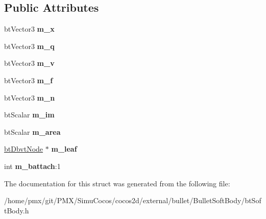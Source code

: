 \subsection*{Public Attributes}
\begin{DoxyCompactItemize}
\item 
\mbox{\label{structbtSoftBody_1_1Node_a302f526590ac3cd265eccfd3f1cfd817}} 
bt\+Vector3 {\bfseries m\+\_\+x}
\item 
\mbox{\label{structbtSoftBody_1_1Node_ab41394c67b5514c0114c6cb0da2d7bb8}} 
bt\+Vector3 {\bfseries m\+\_\+q}
\item 
\mbox{\label{structbtSoftBody_1_1Node_ab286626ebbca7d0ab07fb5bf04232540}} 
bt\+Vector3 {\bfseries m\+\_\+v}
\item 
\mbox{\label{structbtSoftBody_1_1Node_aebe1f784e80e576a11338c21a5717069}} 
bt\+Vector3 {\bfseries m\+\_\+f}
\item 
\mbox{\label{structbtSoftBody_1_1Node_add7c76a258ec17f3856a7b81680b9067}} 
bt\+Vector3 {\bfseries m\+\_\+n}
\item 
\mbox{\label{structbtSoftBody_1_1Node_a24a6d86c8fb27545c995e3664cf47298}} 
bt\+Scalar {\bfseries m\+\_\+im}
\item 
\mbox{\label{structbtSoftBody_1_1Node_a27a52573c1e481488830bcf9f543f16c}} 
bt\+Scalar {\bfseries m\+\_\+area}
\item 
\mbox{\label{structbtSoftBody_1_1Node_acca6a5b8479e45c00e07b68cdc482f3f}} 
\hyperlink{structbtDbvtNode}{bt\+Dbvt\+Node} $\ast$ {\bfseries m\+\_\+leaf}
\item 
\mbox{\label{structbtSoftBody_1_1Node_ab254674b1b0cf75bba85bb59aa98fb69}} 
int {\bfseries m\+\_\+battach}\+:1
\end{DoxyCompactItemize}


The documentation for this struct was generated from the following file\+:\begin{DoxyCompactItemize}
\item 
/home/pmx/git/\+P\+M\+X/\+Simu\+Cocos/cocos2d/external/bullet/\+Bullet\+Soft\+Body/bt\+Soft\+Body.\+h\end{DoxyCompactItemize}
